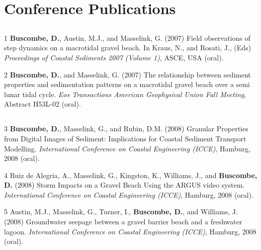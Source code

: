 \documentclass[margin,line]{resume}
\begin{document}
\begin{resume}
\begin{footnotesize}
        \end{footnotesize}

    \section{\mysidestyle Conference Publications}

	\subsection{}
        \begin{footnotesize}
	\begin{list1}
	\item[1] {\bf Buscombe, D.}, Austin, M.J., and Masselink, G. (2007) Field observations of step dynamics on a macrotidal gravel beach. In Kraus, N., and Rosati, J., (Eds) {\sl Proceedings of Coastal Sediments 2007 (Volume 1)}, ASCE, USA (oral).\\
	
	\item[2] {\bf Buscombe, D.}, and Masselink, G. (2007) The relationship between sediment properties and sedimentation patterns on a macrotidal gravel beach over a semi lunar tidal cycle. {\sl Eos Transactions American Geophysical Union Fall Meeting}, Abstract H53L-02 (oral).
	\end{list1}

	\subsection{}
	\begin{list1}
	\item[3] {\bf Buscombe, D.}, Masselink, G., and Rubin, D.M. (2008) Granular Properties from Digital Images of Sediment: Implications for Coastal Sediment Transport Modelling. {\sl International Conference on Coastal Engineering (ICCE)}, Hamburg, 2008 (oral).\\
	
	\item[4] Ruiz de Alegria, A., Masselink, G., Kingston, K., Williams, J., and {\bf Buscombe, D.} (2008) Storm Impacts on a Gravel Beach Using the ARGUS video system. {\sl International Conference on Coastal Engineering (ICCE)}, Hamburg, 2008 (oral).\\
	
	\item[5] Austin, M.J., Masselink, G., Turner, I., {\bf Buscombe, D.}, and Williams, J. (2008) Groundwater seepage between a gravel barrier beach and a freshwater lagoon. {\sl International Conference on Coastal Engineering (ICCE)}, Hamburg, 2008 (oral).\\
	

\end{list1}
\end{footnotesize}
\end{resume}
\end{document}
